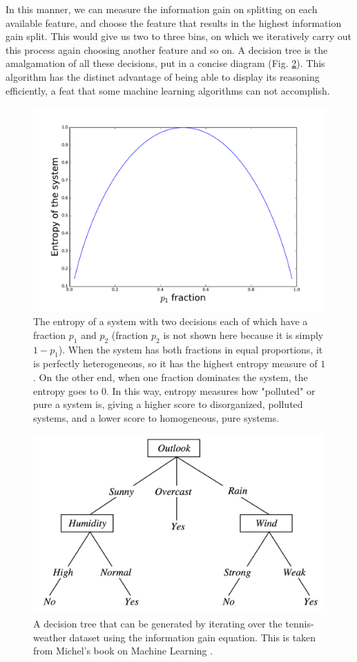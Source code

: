 In this manner, we can measure the information gain on splitting on each available feature, and choose the feature that results in the highest information gain split. This would give us two to three bins, on which we iteratively carry out this process again choosing another feature and so on. A decision tree is the amalgamation of all these decisions, put in a concise diagram (Fig. \ref{fig:decision_tree_for_tennis}). This algorithm has the distinct advantage of being able to display its reasoning efficiently, a feat that some machine learning algorithms can not accomplish.

\begin{figure}
  \centering
  \includegraphics[width=0.7\linewidth]{figures/entropy_fig.pdf}
  \caption{The entropy of a system with two decisions each of which have a fraction $p_1$ and $p_2$ (fraction $p_2$ is not shown here because it is simply $1-p_1$). When the system has both fractions in equal proportions, it is perfectly heterogeneous, so it has the highest entropy measure of $1$. On the other end, when one fraction dominates the system, the entropy goes to $0$. In this way, entropy measures how "polluted" or pure a system is, giving a higher score to disorganized, polluted systems, and a lower score to homogeneous, pure systems.}
  \label{fig:entropy_two_decisions}
\end{figure}

\begin{figure}
\centering
\includegraphics[width=0.7\linewidth]{figures/tennis_decision_tree_mitchel.png}
\caption{A decision tree that can be generated by iterating over the tennis-weather dataset using the information gain equation. This is taken from Michel's book on Machine Learning \cite{mitchell1997machine}.}
\label{fig:decision_tree_for_tennis}
\end{figure}



